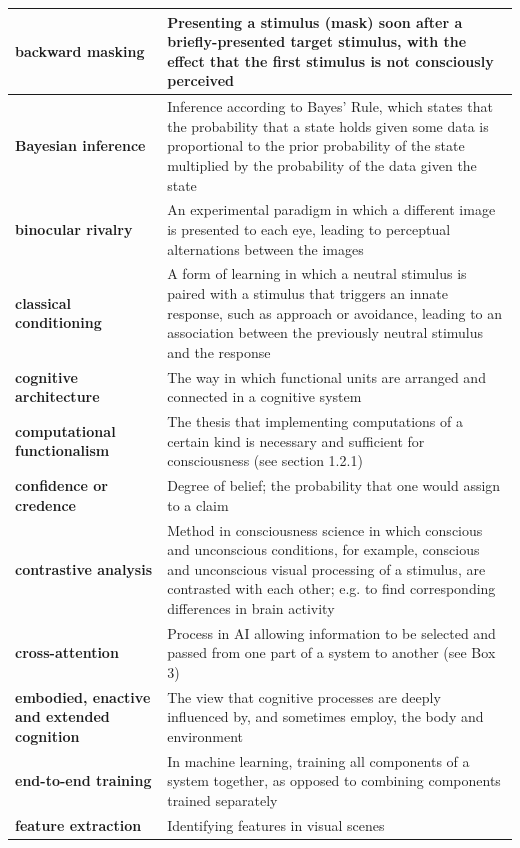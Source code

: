 \documentclass[12pt]{article}
\begin{document}
\begin{longtable}{|>{\raggedright\arraybackslash}p{}|>{\raggedright\arraybackslash}p{}|}
\hline
\textbf{backward masking} & Presenting a stimulus (mask) soon after a briefly-presented target stimulus, with the effect that the first stimulus is not consciously perceived \\
\hline
\textbf{Bayesian inference} & Inference according to Bayes' Rule, which states that the probability that a state holds given some data is proportional to the prior probability of the state multiplied by the probability of the data given the state \\
\hline
\textbf{binocular rivalry} & An experimental paradigm in which a different image is presented to each eye, leading to perceptual alternations between the images \\
\hline
\textbf{classical conditioning} & A form of learning in which a neutral stimulus is paired with a stimulus that triggers an innate response, such as approach or avoidance, leading to an association between the previously neutral stimulus and the response \\
\hline
\textbf{cognitive architecture} & The way in which functional units are arranged and connected in a cognitive system \\
\hline
\textbf{computational functionalism} & The thesis that implementing computations of a certain kind is necessary and sufficient for consciousness (see section 1.2.1) \\
\hline
\textbf{confidence or credence} & Degree of belief; the probability that one would assign to a claim \\
\hline
\textbf{contrastive analysis} & Method in consciousness science in which conscious and unconscious conditions, for example, conscious and unconscious visual processing of a stimulus, are contrasted with each other; e.g. to find corresponding differences in brain activity \\
\hline
\textbf{cross-attention} & Process in AI allowing information to be selected and passed from one part of a system to another (see Box 3) \\
\hline
\textbf{embodied, enactive and extended cognition} & The view that cognitive processes are deeply influenced by, and sometimes employ, the body and environment \\
\hline
\textbf{end-to-end training} & In machine learning, training all components of a system together, as opposed to combining components trained separately \\
\hline
\textbf{feature extraction} & Identifying features in visual scenes \\

\end{longtable}
\end{document}
